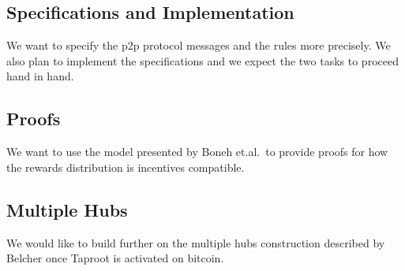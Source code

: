 \documentclass{article}
\begin{document}
\subsection{Specifications and Implementation}

We want to specify the p2p protocol messages and the rules more
precisely. We also plan to implement the specifications and we expect
the two tasks to proceed hand in hand.

\subsection{Proofs}

We want to use the model presented by Boneh et.al.\ to provide proofs
for how the rewards distribution is incentives compatible.

\subsection{Multiple Hubs}

We would like to build further on the multiple hubs construction
described by Belcher once Taproot is activated on bitcoin.

 

\end{document}
